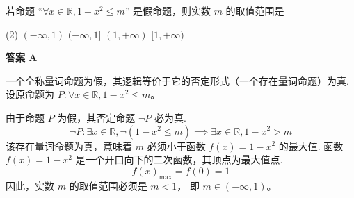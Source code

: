 \begin{choice}[topic={全称命题的否定}]
若命题 ``$\forall x \in \mathbb{R}, 1-x^2 \le m$'' 是假命题，则实数 $m$ 的取值范围是
\begin{tasks}(2)
	\task $(-\infty, 1)$
	\task $(-\infty, 1]$
	\task $(1, +\infty)$
	\task $[1, +\infty)$
\end{tasks}
\end{choice}
\begin{choice-sol}
\textbf{答案 A}

一个全称量词命题为假，其逻辑等价于它的否定形式（一个存在量词命题）为真.
设原命题为 $P: \forall x \in \mathbb{R}, 1-x^2 \le m$。

由于命题 $P$ 为假，其否定命题 $\neg P$ 必为真.
\[ \neg P: \exists x \in \mathbb{R}, \neg(1-x^2 \le m) \implies \exists x \in \mathbb{R}, 1-x^2 > m \]
该存在量词命题为真，意味着 $m$ 必须小于函数 $f(x) = 1-x^2$ 的最大值.
函数 $f(x)=1-x^2$ 是一个开口向下的二次函数，其顶点为最大值点.
\[ f(x)_{\max} = f(0) = 1 \]
因此，实数 $m$ 的取值范围必须是 $m < 1$，
即 $m \in (-\infty, 1)$。
\end{choice-sol}
